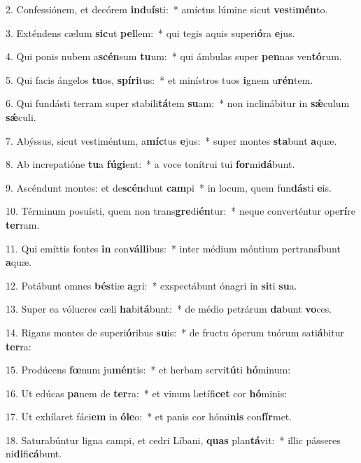 2. Confessiónem, et decórem \textbf{ind}u\textbf{ís}ti:~*  amíctus lúmine sicut \textbf{ves}ti\textbf{mén}to.\

3. Exténdens cælum \textbf{sic}ut \textbf{pel}lem:~*  qui tegis aquis superi\textbf{ó}ra \textbf{e}jus.\

4. Qui ponis nubem a\textbf{scén}sum \textbf{tu}um:~*  qui ámbulas super \textbf{pen}nas ven\textbf{tó}rum.\

5. Qui facis ángelos \textbf{tu}os, \textbf{spí}\textbf{ri}tus:~*  et minístros tuos \textbf{i}gnem u\textbf{rén}tem.\

6. Qui fundásti terram super stabili\textbf{tá}tem \textbf{su}am:~*  non inclinábitur in \textbf{sǽ}culum \textbf{sǽ}culi.\

7. Abýssus, sicut vestiméntum, a\textbf{míc}tus \textbf{e}jus:~*  super montes \textbf{sta}bunt \textbf{a}quæ.\

8. Ab increpatióne \textbf{tu}a \textbf{fú}\textbf{gi}ent:~*  a voce tonítrui tui \textbf{for}mi\textbf{dá}bunt.\

9. Ascéndunt montes: et de\textbf{scén}dunt \textbf{cam}pi~*  in locum, quem fun\textbf{dás}ti \textbf{e}is.\

10. Términum posuísti, quem non trans\textbf{gre}di\textbf{én}tur:~*  neque converténtur ope\textbf{rí}re \textbf{ter}ram.\

11. Qui emíttis fontes \textbf{in} con\textbf{vál}\textbf{li}bus:~*  inter médium móntium pertrans\textbf{í}bunt \textbf{a}quæ.\

12. Potábunt omnes \textbf{bés}tiæ \textbf{a}gri:~*  exspectábunt ónagri in \textbf{si}ti \textbf{su}a.\

13. Super ea vólucres cæli \textbf{ha}bi\textbf{tá}bunt:~*  de médio petrárum \textbf{da}bunt \textbf{vo}ces.\

14. Rigans montes de superi\textbf{ó}ribus \textbf{su}is:~*  de fructu óperum tuórum sati\textbf{á}bitur \textbf{ter}ra:\

15. Prodúcens \textbf{fœ}num ju\textbf{mén}tis:~*  et herbam servi\textbf{tú}ti \textbf{hó}minum:\

16. Ut edúcas \textbf{pa}nem de \textbf{ter}ra:~*  et vinum lætífi\textbf{cet} cor \textbf{hó}minis:\

17. Ut exhílaret fáci\textbf{em} in \textbf{ó}\textbf{le}o:~*  et panis cor hómi\textbf{nis} con\textbf{fír}met.\

18. Saturabúntur ligna campi, et cedri Líbani, \textbf{quas} plan\textbf{tá}vit:~*  illic pásseres ni\textbf{di}fi\textbf{cá}bunt.\

